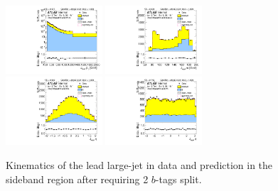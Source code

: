 \clearpage

\begin{figure}[htbp!]
\begin{center}
\includegraphics[width=0.32\textwidth,angle=-90]{figures/boosted/Sideband/b77_TwoTag_split_Sideband_leadHCand_Pt_m_1.pdf}
\includegraphics[width=0.32\textwidth,angle=-90]{figures/boosted/Sideband/b77_TwoTag_split_Sideband_leadHCand_Mass_s.pdf}\\
\includegraphics[width=0.32\textwidth,angle=-90]{figures/boosted/Sideband/b77_TwoTag_split_Sideband_leadHCand_Eta.pdf}
\includegraphics[width=0.32\textwidth,angle=-90]{figures/boosted/Sideband/b77_TwoTag_split_Sideband_leadHCand_Phi.pdf}
  \caption{Kinematics of the lead large-\R jet in data and prediction in the sideband region after requiring 2 $b$-tags split.}
  \label{fig:boosted-2bs-sideband-ak10-lead}
\end{center}
\end{figure}

